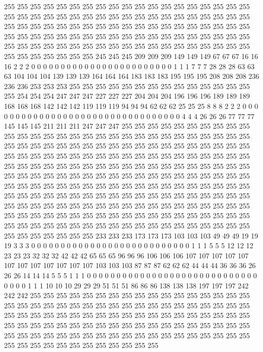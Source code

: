 255 255 255 255 255 255 255 255 255 255 255 255 255 255 255 255 255 255 255 255 255 255 255 255 255 255 255 255 255 255 255 255 255 255 255 255 255 255 255 255 255 255 255 255 255 255 255 255 255 255 255 255 255 255 255 255 255 255 255 255 255 255 255 255 255 255 255 255 255 255 255 255 255 255 255 255 255 255 255 255 255 255 255 255 255 255 255 255 255 255 255 255 255 255 255 255 255 255 255 255 255 255 245 245 245 209 209 209 149 149 149 67 67 67 16 16 16 2 2 2 0 0 0 0 0 0 0 0 
0 0 0 0 0 0 0 0 0 0 0 0 0 0 0 0 1 1 1 7 7 7 28 28 28 63 63 63 104 104 104 139 139 139 164 164 164 183 183 183 195 195 195 208 208 208 236 236 236 253 253 253 255 255 255 255 255 255 255 255 255 255 255 255 255 255 255 254 254 254 247 247 247 227 227 227 204 204 204 196 196 196 189 189 189 168 168 168 142 142 142 119 119 119 94 94 94 62 62 62 25 25 25 8 8 8 2 2 2 0 0 0 0 0 0 0 0 0 0 0 0 0 0 0 0 0 0 0 
0 0 0 0 0 0 0 0 0 0 0 0 0 0 4 4 4 26 26 26 77 77 77 145 145 145 211 211 211 247 247 247 255 255 255 255 255 255 255 255 255 255 255 255 255 255 255 255 255 255 255 255 255 255 255 255 255 255 255 255 255 255 255 255 255 255 255 255 255 255 255 255 255 255 255 255 255 255 255 255 255 255 255 255 255 255 255 255 255 255 255 255 255 255 255 255 255 255 255 255 255 255 255 255 255 255 255 255 255 255 255 255 255 255 255 255 255 255 255 255 255 255 255 255 255 255 255 255 
255 255 255 255 255 255 255 255 255 255 255 255 255 255 255 255 255 255 255 255 255 255 255 255 255 255 255 255 255 255 255 255 255 255 255 255 255 255 255 255 255 255 255 255 255 255 255 255 255 255 255 255 255 255 255 255 255 255 255 255 255 255 255 255 255 255 255 255 255 255 255 255 255 255 255 255 255 255 255 255 255 255 255 255 255 255 255 255 255 255 255 255 255 255 255 255 255 255 255 255 255 255 255 255 255 255 255 255 255 255 255 233 233 233 173 173 173 103 103 103 49 49 49 19 19 19 3 3 
3 0 0 0 0 0 0 0 0 0 0 0 0 0 0 0 0 0 0 0 0 0 0 0 0 0 0 0 1 1 1 5 5 5 12 12 12 23 23 23 32 32 32 42 42 42 65 65 65 96 96 96 106 106 106 107 107 107 107 107 107 107 107 107 107 107 107 103 103 103 87 87 87 62 62 62 44 44 44 36 36 36 26 26 26 14 14 14 5 5 5 1 1 1 0 0 0 0 0 0 0 0 0 0 0 0 0 0 0 0 0 0 0 0 0 0 0 0 0 0 0 0 0 0 0 0 0 1 
1 1 10 10 10 29 29 29 51 51 51 86 86 86 138 138 138 197 197 197 242 242 242 255 255 255 255 255 255 255 255 255 255 255 255 255 255 255 255 255 255 255 255 255 255 255 255 255 255 255 255 255 255 255 255 255 255 255 255 255 255 255 255 255 255 255 255 255 255 255 255 255 255 255 255 255 255 255 255 255 255 255 255 255 255 255 255 255 255 255 255 255 255 255 255 255 255 255 255 255 255 255 255 255 255 255 255 255 255 255 255 255 255 255 255 255 255 255 255 255 255 255 255 255 255 255 255 255 
